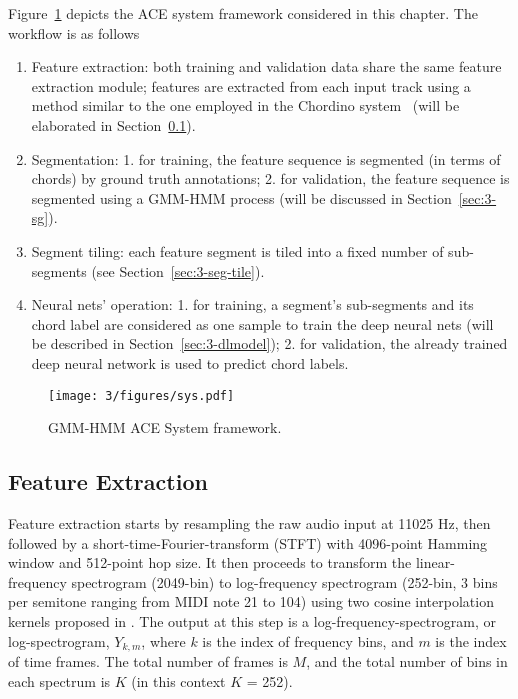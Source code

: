 Figure~\ref{fig:3-sysover} depicts the ACE system framework considered in this chapter. The workflow is as follows%
\begin{enumerate}
	\item Feature extraction: both training and validation data share the same feature extraction module; features are extracted from each input track using a method similar to the one employed in the Chordino system~\cite{mauch2010automatic} (will be elaborated in Section~\ref{sec:3-fe}).
	\item Segmentation: 1. for training, the feature sequence is segmented (in terms of chords) by ground truth annotations; 2. for validation, the feature sequence is segmented using a GMM-HMM process (will be discussed in Section~\ref{sec:3-sg}).
	\item Segment tiling: each feature segment is tiled into a fixed number of sub-segments (see Section~\ref{sec:3-seg-tile}).
	\item Neural nets' operation: 1. for training, a segment's sub-segments and its chord label are considered as one sample to train the deep neural nets (will be described in Section~\ref{sec:3-dlmodel}); 2. for validation, the already trained deep neural network is used to predict chord labels.
\end{enumerate}

\begin{figure}
\centering
\texttt{[image: 3/figures/sys.pdf]}
\caption{GMM-HMM ACE System framework.}
\label{fig:3-sysover}
\end{figure}

\subsection{Feature Extraction} \label{sec:3-fe}
Feature extraction starts by resampling the raw audio input at 11025 Hz, then followed by a short-time-Fourier-transform (STFT) with 4096-point Hamming window and 512-point hop size. It then proceeds to transform the linear-frequency spectrogram (2049-bin) to log-frequency spectrogram (252-bin, 3 bins per semitone ranging from MIDI note 21 to 104) using two cosine interpolation kernels proposed in \cite{mauch2010automatic}. The output at this step is a log-frequency-spectrogram, or log-spectrogram, $Y_{k,m}$, where $k$ is the index of frequency bins, and $m$ is the index of time frames. The total number of frames is $M$, and the total number of bins in each spectrum is $K$ (in this context $K$ = 252).

